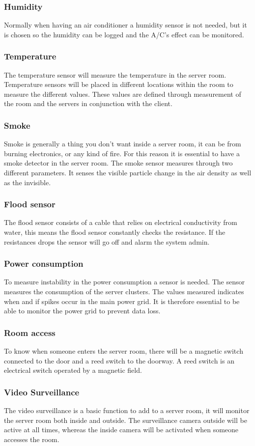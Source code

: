 \subsubsection{Humidity}
Normally when having an air conditioner a humidity sensor is not needed, but it is chosen so the humidity can be logged and the A/C’s effect can be monitored.

\subsubsection{Temperature}
The temperature sensor will measure the temperature in the server room. Temperature sensors will be placed in different locations within the room to measure the different values. These values are defined through measurement of the room and the servers in conjunction with the client.

\subsubsection{Smoke}
Smoke is generally a thing you don’t want inside a server room, it can be from burning electronics, or any kind of fire. For this reason it is essential to have a smoke detector in the server room.
The smoke sensor measures through two different parameters. It senses the visible particle change in the air density as well as the invisible. 

\subsubsection{Flood sensor}
The flood sensor consists of a cable that relies on electrical conductivity from water, this means the flood sensor constantly checks the resistance. If the resistances drops the sensor will go off and alarm the system admin.

\subsubsection{Power consumption}
To measure instability in the power consumption a sensor is needed. The sensor measures the consumption of the server clusters. The values measured indicates when and if spikes occur in the main power grid. It is therefore essential to be able to monitor the power grid to prevent data loss. 

\subsubsection{Room access}
To know when someone enters the server room, there will be a magnetic switch connected to the door and a reed switch to the doorway. A reed switch is an electrical switch operated by a magnetic field. 

\subsubsection{Video Surveillance}
The video surveillance is a basic function to add to a server room, it will monitor the server room both inside and outside. The surveillance camera outside will be active at all times, whereas the inside camera will be activated when someone accesses the room.